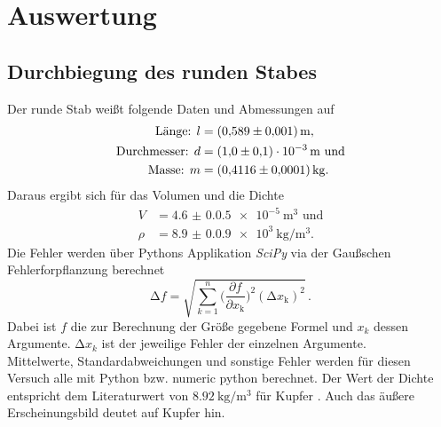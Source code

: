 \section{Auswertung}
\label{sec:Auswertung}
\subsection{Durchbiegung des runden Stabes}
Der runde Stab weißt folgende Daten und Abmessungen auf
\begin{align*}
    \text{Länge: } l&=\qty{0,589(0.001)}{\meter},\\
    \text{Durchmesser: } d&=\qty{1,0(0,1)e-3}{\meter}\text{ und}\\
    \text{Masse: } m&=\qty{0,4116(0.0001)}{\kilo\gram}.
\end{align*}
Daraus ergibt sich für das Volumen und die Dichte 
\begin{align*}
    V&=\qty{4.6(0.05)e-5}{\meter\cubed}\text{ und}\\
    \rho&=\qty{8.9(0.09)e3}{\kilo\gram\per\meter\cubed}.
\end{align*}
Die Fehler werden über Pythons Applikation \textit{SciPy} via der Gaußschen 
Fehlerforpflanzung berechnet
\begin{equation}
    \increment f=\sqrt{\sum_{k=1}^{n}\biggl(\frac{\partial f}{\partial x_\text{k}}\biggr)^2(\increment x_\text{k})^2}\,.
    \label{eq:gauss}
    \end{equation}
Dabei ist $f$ die zur Berechnung der Größe gegebene Formel und $x_k$ dessen Argumente.
$\increment x_k$ ist der jeweilige Fehler der einzelnen Argumente.\\ 
Mittelwerte, Standardabweichungen und sonstige Fehler werden für diesen Versuch alle mit Python bzw. 
numeric python berechnet. \noindent 
Der Wert der Dichte entspricht dem Literaturwert von $\qty{8,92}{\kilo\gram\per\meter\cubed}$ für Kupfer \cite{Kupfer}. 
Auch das äußere Erscheinungsbild deutet auf Kupfer hin.
